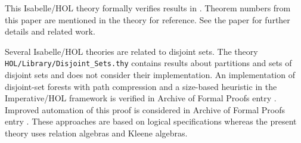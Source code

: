 \documentclass[11pt,a4paper]{article}
\begin{document}
This Isabelle/HOL theory formally verifies results in \cite{Guttmann2020b}.
Theorem numbers from this paper are mentioned in the theory for reference.
See the paper for further details and related work.

Several Isabelle/HOL theories are related to disjoint sets.
The theory \texttt{HOL/Library/Disjoint\_Sets.thy} contains results about partitions and sets of disjoint sets and does not consider their implementation.
An implementation of disjoint-set forests with path compression and a size-based heuristic in the Imperative/HOL framework is verified in Archive of Formal Proofs entry \cite{LammichMeis2012}.
Improved automation of this proof is considered in Archive of Formal Proofs entry \cite{Zhan2018}.
These approaches are based on logical specifications whereas the present theory uses relation algebras and Kleene algebras.

\begin{flushleft}

\end{flushleft}



\end{document}
